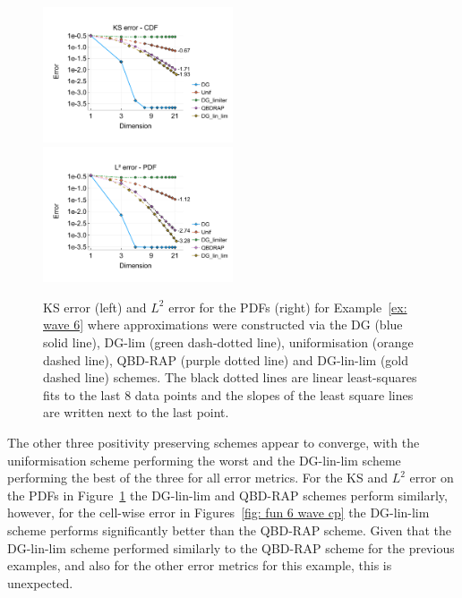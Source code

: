 \begin{example}
	\begin{figure}[h]
		\centering
		\includegraphics[width=0.5\textwidth,trim={0.75cm 0.8cm 0.25cm 1.25cm},clip]{chapter6/figs/wave/fun6/meshs_ks_error_formatted.pdf}%
		\includegraphics[width=0.5\textwidth,trim={0.75cm 0.8cm 0.25cm 1.25cm},clip]{chapter6/figs/wave/fun6/meshs_l2_pdf_error_formatted.pdf}
		\caption{KS error (left) and \(L^2\) error for the PDFs (right) for Example~\ref{ex: wave 6} where approximations were constructed via the DG (blue solid line), DG-lim (green dash-dotted line), uniformisation (orange dashed line), QBD-RAP (purple dotted line) and DG-lin-lim (gold dashed line) schemes. The black dotted lines are linear least-squares fits to the last 8 data points and the slopes of the least square lines are written next to the last point.} 
		\label{fig: fun 6 wave} 
	\end{figure}
	The other three positivity preserving schemes appear to converge, with the uniformisation scheme performing the worst and the DG-lin-lim scheme performing the best of the three for all error metrics. For the KS and \(L^2\) error on the PDFs in Figure~\ref{fig: fun 6 wave} the DG-lin-lim and QBD-RAP schemes perform similarly, however, for the cell-wise error in Figures~\ref{fig: fun 6 wave cp} the DG-lin-lim scheme performs significantly better than the QBD-RAP scheme. Given that the DG-lin-lim scheme performed similarly to the QBD-RAP scheme for the previous examples, and also for the other error metrics for this example, this is unexpected. 
	

\end{example}
